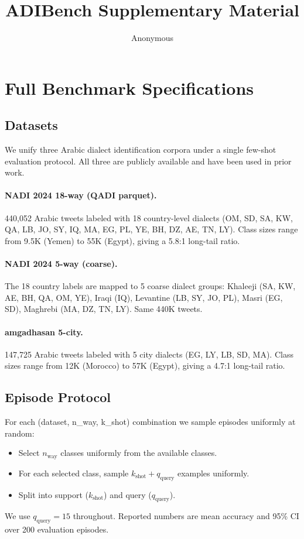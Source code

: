 \documentclass[11pt,a4paper]{article}
\title{ADIBench Supplementary Material}
\author{Anonymous}
\date{}
\begin{document}
\maketitle
\appendix
\renewcommand{\thetable}{A.\arabic{table}}
\renewcommand{\thefigure}{A.\arabic{figure}}

\section{Full Benchmark Specifications}

\subsection{Datasets}
We unify three Arabic dialect identification corpora under a single
few-shot evaluation protocol. All three are publicly available and
have been used in prior work.

\paragraph{NADI 2024 18-way (QADI parquet).}
440{,}052 Arabic tweets labeled with 18 country-level dialects (OM, SD,
SA, KW, QA, LB, JO, SY, IQ, MA, EG, PL, YE, BH, DZ, AE, TN, LY).
Class sizes range from 9.5K (Yemen) to 55K (Egypt), giving a
5.8:1 long-tail ratio.

\paragraph{NADI 2024 5-way (coarse).}
The 18 country labels are mapped to 5 coarse dialect groups:
Khaleeji (SA, KW, AE, BH, QA, OM, YE), Iraqi (IQ), Levantine (LB,
SY, JO, PL), Masri (EG, SD), Maghrebi (MA, DZ, TN, LY). Same
440K tweets.

\paragraph{amgadhasan 5-city.}
147{,}725 Arabic tweets labeled with 5 city dialects (EG, LY, LB, SD,
MA). Class sizes range from 12K (Morocco) to 57K (Egypt), giving a
4.7:1 long-tail ratio.

\subsection{Episode Protocol}
For each (dataset, n\_way, k\_shot) combination we sample
episodes uniformly at random:
\begin{itemize}
\itemsep0pt
\item Select $n_{\text{way}}$ classes uniformly from the available
      classes.
\item For each selected class, sample $k_{\text{shot}}+q_{\text{query}}$
      examples uniformly.
\item Split into support ($k_{\text{shot}}$) and query ($q_{\text{query}}$).
\end{itemize}
We use $q_{\text{query}}=15$ throughout. Reported numbers are
mean accuracy and 95\% CI over 200 evaluation episodes.
\end{document}
